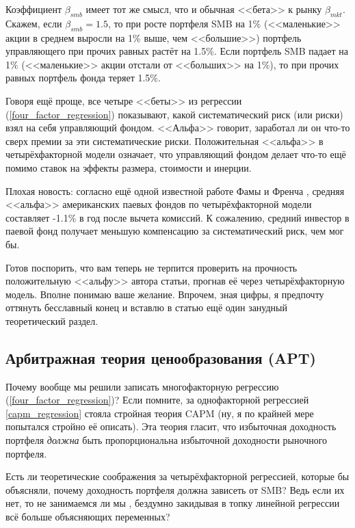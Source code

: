Коэффициент $\beta_{smb}$ имеет тот же смысл, что и обычная <<бета>> к рынку $\beta_{mkt}$. Скажем, если $\beta_{smb}=1.5$, то при росте портфеля SMB на 1\% (<<маленькие>> акции в среднем выросли на 1\% выше, чем <<большие>>) портфель управляющего при прочих равных растёт на 1.5\%. Если портфель SMB падает на 1\% (<<маленькие>> акции отстали от <<больших>> на 1\%), то при прочих равных портфель фонда теряет 1.5\%.

Говоря ещё проще, все четыре <<беты>> из регрессии (\ref{four_factor_regression}) показывают, какой систематический риск (или риски) взял на себя управляющий фондом. <<Альфа>> говорит, заработал ли он что-то сверх премии за эти систематические риски. Положительная <<альфа>> в четырёхфакторной модели означает, что управляющий фондом делает что-то ещё помимо ставок на эффекты размера, стоимости и инерции.

Плохая новость: согласно ещё одной известной работе Фамы и Френча \cite{fama2010luck}, средняя <<альфа>> американских паевых фондов по четырёхфакторной модели составляет -1.1\% в год после вычета комиссий. К сожалению, средний инвестор в паевой фонд получает меньшую компенсацию за систематический риск, чем мог бы.

Готов поспорить, что вам теперь не терпится проверить на прочность положительную <<альфу>> автора статьи, прогнав её через четырёхфакторную модель. Вполне понимаю ваше желание. Впрочем, зная цифры, я предпочту оттянуть бесславный конец и вставлю в статью ещё один занудный теоретический раздел.

\subsection{Арбитражная теория ценообразования (APT)}

Почему вообще мы решили записать многофакторную регрессию (\ref{four_factor_regression})? Если помните, за однофакторной регрессией \ref{capm_regression} стояла стройная теория CAPM (ну, я по крайней мере попытался стройно её описать). Эта теория гласит, что избыточная доходность портфеля \emph{должна} быть пропорциональна избыточной доходности рыночного портфеля.

Есть ли теоретические соображения за четырёхфакторной регрессией, которые бы объясняли, почему доходность портфеля должна зависеть от SMB? Ведь если их нет, то не занимаемся ли мы , бездумно закидывая в топку линейной регрессии всё больше объясняющих переменных?

